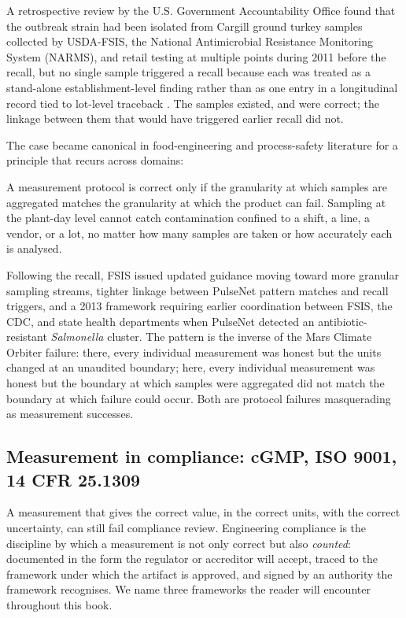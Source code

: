 A retrospective review by the U.S. Government Accountability Office
found that the outbreak strain had been isolated from Cargill
ground turkey samples collected by USDA-FSIS, the National
Antimicrobial Resistance Monitoring System (NARMS), and retail
testing at multiple points during 2011 before the recall, but no
single sample triggered a recall because each was treated as a
stand-alone establishment-level finding rather than as one entry in
a longitudinal record tied to lot-level traceback \cite[p.~22]{acc:ch01t3b-gao-fsis-sampling-2012}.
The samples existed, and were correct; the linkage between them
that would have triggered earlier recall did not.

The case became canonical in food-engineering and process-safety
literature for a principle that recurs across domains:

\begin{principle}
A measurement protocol is correct only if the granularity at which
samples are aggregated matches the granularity at which the product
can fail. Sampling at the plant-day level cannot catch contamination
confined to a shift, a line, a vendor, or a lot, no matter how many
samples are taken or how accurately each is analysed.
\end{principle}

Following the recall, FSIS issued updated guidance moving toward
more granular sampling streams, tighter linkage between PulseNet
pattern matches and recall triggers, and a 2013 framework requiring
earlier coordination between FSIS, the CDC, and state health
departments when PulseNet detected an antibiotic-resistant
\emph{Salmonella} cluster. The pattern is the inverse of the Mars
Climate Orbiter failure: there, every individual measurement was
honest but the units changed at an unaudited boundary; here, every
individual measurement was honest but the boundary at which samples
were aggregated did not match the boundary at which failure could
occur. Both are protocol failures masquerading as measurement
successes.

\subsection{Measurement in compliance: cGMP, ISO 9001, 14 CFR 25.1309}

A measurement that gives the correct value, in the correct units,
with the correct uncertainty, can still fail compliance review.
Engineering compliance is the discipline by which a measurement is
not only correct but also \emph{counted}: documented in the form
the regulator or accreditor will accept, traced to the framework
under which the artifact is approved, and signed by an authority
the framework recognises. We name three frameworks the reader will
encounter throughout this book.

